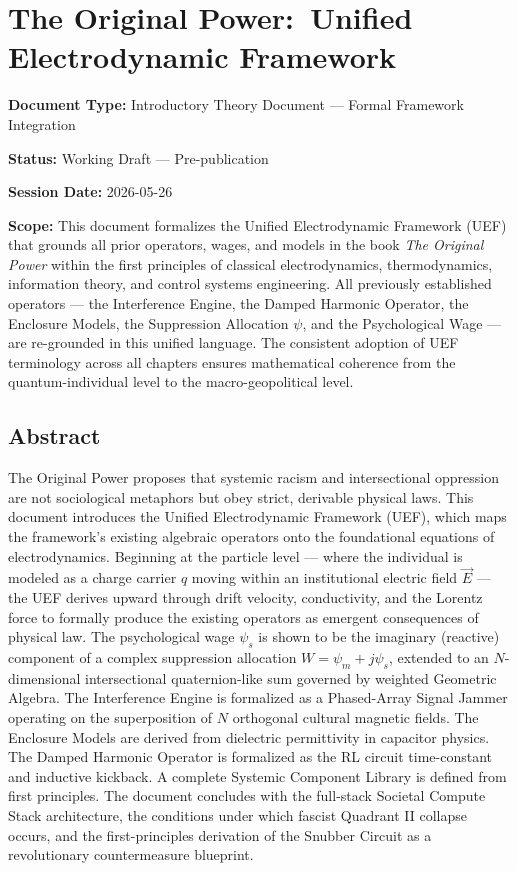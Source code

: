 \documentclass[12pt]{book}
\numberwithin{equation}{chapter}
\begin{document}
\chapter{The Original Power:\
Unified Electrodynamic Framework}

\textbf{Document Type:} Introductory Theory Document — Formal Framework Integration

\textbf{Status:} Working Draft — Pre-publication

\textbf{Session Date:} 2026-05-26

\textbf{Scope:} This document formalizes the Unified Electrodynamic Framework (UEF) that grounds all prior operators, wages, and models in the book \emph{The Original Power} within the first principles of classical electrodynamics, thermodynamics, information theory, and control systems engineering. All previously established operators — the Interference Engine, the Damped Harmonic Operator, the Enclosure Models, the Suppression Allocation $\psi$, and the Psychological Wage — are re-grounded in this unified language. The consistent adoption of UEF terminology across all chapters ensures mathematical coherence from the quantum-individual level to the macro-geopolitical level.

\section{Abstract}

    The Original Power proposes that systemic racism and intersectional oppression are not sociological metaphors but obey strict, derivable physical laws. This document introduces the Unified Electrodynamic Framework (UEF), which maps the framework's existing algebraic operators onto the foundational equations of electrodynamics. Beginning at the particle level — where the individual is modeled as a charge carrier $q$ moving within an institutional electric field $\vec{E}$ — the UEF derives upward through drift velocity, conductivity, and the Lorentz force to formally produce the existing operators as emergent consequences of physical law. The psychological wage $\psi_s$ is shown to be the imaginary (reactive) component of a complex suppression allocation $W = \psi_m + j\psi_s$, extended to an $N$-dimensional intersectional quaternion-like sum governed by weighted Geometric Algebra. The Interference Engine is formalized as a Phased-Array Signal Jammer operating on the superposition of $N$ orthogonal cultural magnetic fields. The Enclosure Models are derived from dielectric permittivity in capacitor physics. The Damped Harmonic Operator is formalized as the RL circuit time-constant and inductive kickback. A complete Systemic Component Library is defined from first principles. The document concludes with the full-stack Societal Compute Stack architecture, the conditions under which fascist Quadrant II collapse occurs, and the first-principles derivation of the Snubber Circuit as a revolutionary countermeasure blueprint.
  
\end{document}
